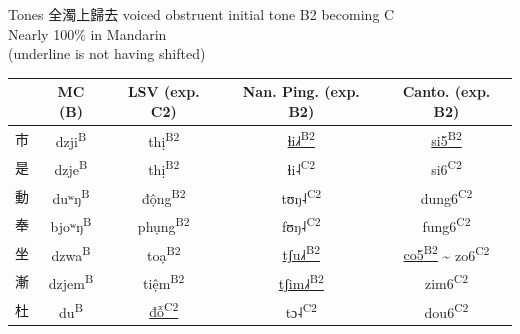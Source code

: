 \documentclass{beamer}
\begin{document}
\begin{frame}[fragile]{Tones}
全濁上歸去 voiced obstruent initial tone B2 becoming C\\
{\footnotesize Nearly 100\% in Mandarin\\ 
(underline is not having shifted)}\\

\bigskip
\begin{tabular}{c c|c c c}
 & MC {\scriptsize(B)} & LSV {\scriptsize(exp. C2)} & Nan. Ping. {\scriptsize(exp. B2)}& Canto. {\scriptsize(exp. B2)} \\ \hline
市 & dzji\textsuperscript{B} & thị\textsuperscript{B2}& \underline{ɬi˩˧\textsuperscript{B2}} & \underline{si5\textsuperscript{B2}}\\
是 & dzje\textsuperscript{B} & thị\textsuperscript{B2}& ɬi˨\textsuperscript{C2} & si6\textsuperscript{C2}\\
動 & duʷŋ\textsuperscript{B} & động\textsuperscript{B2} & tʊŋ˨\textsuperscript{C2}& dung6\textsuperscript{C2}\\
奉 & bjoʷŋ\textsuperscript{B} & phụng\textsuperscript{B2} & fʊŋ˨\textsuperscript{C2} & fung6\textsuperscript{C2}\\
坐 & dzwa\textsuperscript{B} & toạ\textsuperscript{B2} & \underline{tʃu˩˧\textsuperscript{B2}} & \underline{co5\textsuperscript{B2}} \~{} zo6\textsuperscript{C2}\\
漸 & dzjem\textsuperscript{B}& tiệm\textsuperscript{B2} & \underline{tʃim˩˧\textsuperscript{B2}} & zim6\textsuperscript{C2}\\ 
杜 & du\textsuperscript{B} & \underline{đỗ\textsuperscript{C2}} & tɔ˨\textsuperscript{C2} &  dou6\textsuperscript{C2}\\
\end{tabular}

\end{frame}
\end{document}
